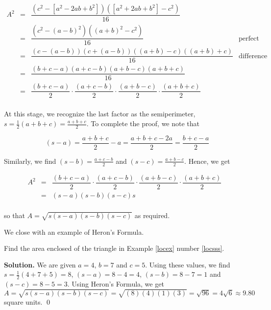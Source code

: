\[ \begin{array}{rclr}

A^2	& = & \dfrac{\left(c^2 - \left[a^2 - 2ab + b^2\right] \right)  \left( \left[a^2 + 2ab + b^2\right]- c^2\right)}{16}  &  \\ [10pt]

	 	& = & \dfrac{\left(c^2 - (a-b)^2 \right)  \left( (a+b)^2- c^2\right)}{16}  &  \text{perfect square trinomials.}\\ [10pt]
	 	
	 	& = & \dfrac{ (c-(a-b))(c+(a-b))((a+b) -c)((a+b)+c)}{16}  &  \text{difference of squares.} \\ [10pt]
	 			 
	 	& = & \dfrac{ (b+c-a)(a+c-b)(a+b-c)(a+b+c)}{16}  &  \\ [10pt]	 	
	 	
	  & = & \dfrac{(b+c-a)}{2} \cdot \dfrac{(a+c-b)}{2} \cdot \dfrac{(a+b-c)}{2} \cdot \dfrac{(a+b+c)}{2}  &  \\ [10pt]	 
	 		
\end{array} \]

At this stage, we recognize the last factor as the semiperimeter, $s = \frac{1}{2}(a+b+c) = \frac{a+b+c}{2}$.  To complete the proof, we note that

\[ (s - a) = \dfrac{a+b+c}{2} - a = \dfrac{a+b+c-2a}{2} = \dfrac{b+c-a}{2} \]  
			
Similarly, we find $(s-b) = \frac{a+c-b}{2}$ and $(s-c) = \frac{a+b-c}{2}$.  Hence, we get

\[ \begin{array}{rclr}

A^2 & = & \dfrac{(b+c-a)}{2} \cdot \dfrac{(a+c-b)}{2} \cdot \dfrac{(a+b-c)}{2} \cdot \dfrac{(a+b+c)}{2}  &  \\ [10pt]	 
	 	
	 	& = & (s-a) (s-b) (s-c) s  &  \\ [10pt]	 	
	 	
\end{array} \]

so that  $A = \sqrt{s(s-a)(s-b)(s-c)}$ as required. 

\bigskip

We close with an example of Heron's Formula.

\begin{ex} \label{heronex}  Find the area enclosed of the triangle in Example \ref{locex} number \ref{locsss}.

\medskip

{\bf Solution.}  We are given $a = 4$, $b=7$ and $c = 5$.  Using these values, we find $s = \frac{1}{2}(4+7+5) = 8$, $(s - a) = 8 - 4 = 4$, $(s-b) = 8-7 =1$ and $(s-c) = 8-5=3$. Using Heron's Formula, we get $A = \sqrt{s(s-a)(s-b)(s-c)} = \sqrt{(8)(4)(1)(3)} = \sqrt{96} = 4\sqrt{6} \approx 9.80$ square units. \qed

\end{ex}

